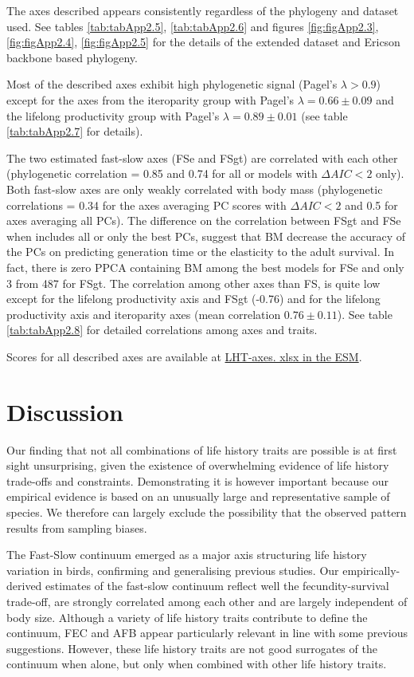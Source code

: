 The axes described appears consistently regardless of the phylogeny and dataset
used. See tables \ref{tab:tabApp2.5}, \ref{tab:tabApp2.6} and figures
\ref{fig:figApp2.3}, \ref{fig:figApp2.4}, \ref{fig:figApp2.5} for the details of
the extended dataset and Ericson backbone based phylogeny.

Most of the described axes exhibit high phylogenetic signal (Pagel's
$\lambda > 0.9$) except for the axes from the iteroparity group with Pagel's
$\lambda = 0.66 \pm 0.09$ and the lifelong productivity group with Pagel's
$\lambda = 0.89 \pm 0.01$ (see table \ref{tab:tabApp2.7} for details).

The two estimated fast-slow axes (FSe and FSgt) are correlated with each
other (phylogenetic correlation =  0.85 and 0.74 for all or models with
$\Delta AIC < 2$ only). Both fast-slow axes are only weakly correlated with
body mass (phylogenetic correlations = 0.34 for the axes averaging PC
scores with $\Delta AIC < 2$ and 0.5 for axes averaging all PCs). The difference
on the correlation between FSgt and FSe when includes all or only the best PCs,
suggest that BM decrease the accuracy of the PCs on predicting generation time
or the elasticity to the adult survival. In fact, there is zero PPCA containing
BM among the best models for FSe and only 3 from 487 for FSgt. The correlation
among other axes than FS, is quite low except for the lifelong productivity axis
and FSgt (-0.76) and for the lifelong productivity axis and iteroparity axes
(mean correlation $0.76 \pm 0.11$). See table \ref{tab:tabApp2.8} for detailed
correlations among axes and traits.

Scores for all described axes are available at
\href{https://github.com/jmaspons/Thesis/tree/master/ESM/chapter02}{LHT-axes.
xlsx in the ESM}.


\section{Discussion}

Our finding that not all combinations of life history traits are possible is at 
first sight unsurprising, given the existence of overwhelming evidence of life 
history trade-offs and constraints. Demonstrating it is however important 
because our empirical evidence is based on an unusually large and representative 
sample of species. We therefore can largely exclude the possibility that the 
observed pattern results from sampling biases.

The Fast-Slow continuum emerged as a major axis structuring life history 
variation in birds, confirming and generalising previous studies. Our 
empirically-derived estimates of the fast-slow continuum reflect well the 
fecundity-survival trade-off, are strongly correlated among each other and are 
largely independent of body size. Although a variety of life history traits 
contribute to define the continuum, FEC and AFB appear particularly relevant in
line with some previous suggestions. However, these life history traits are not
good surrogates of the continuum when alone, but only when combined with other
life history traits.

